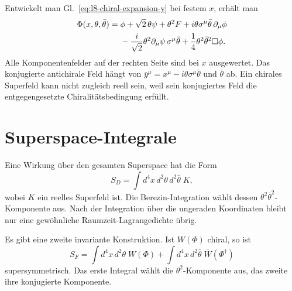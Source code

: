 Entwickelt man Gl.~\eqref{eq:l8-chiral-expansion-y} bei festem \(x\), erhält man
\begin{align}
\Phi(x,\theta,\bar\theta)
={}&\phi
+\sqrt2\,\theta\psi
+\theta^2F
+i\theta\sigma^\mu\bar\theta\,\partial_\mu\phi
\notag\\
&-\frac{i}{\sqrt2}\theta^2
\partial_\mu\psi\,\sigma^\mu\bar\theta
+\frac14\theta^2\bar\theta^2\Box\phi.
\label{eq:l8-chiral-expansion-x}
\end{align}
Alle Komponentenfelder auf der rechten Seite sind bei \(x\) ausgewertet. Das konjugierte antichirale Feld hängt von
\(\bar y^\mu=x^\mu-i\theta\sigma^\mu\bar\theta\) und \(\bar\theta\) ab. Ein chirales Superfeld kann nicht zugleich reell sein, weil sein konjugiertes Feld die entgegengesetzte Chiralitätsbedingung erfüllt.

\section{Superspace-Integrale}

Eine Wirkung über den gesamten Superspace hat die Form
\begin{equation}
S_D=\int d^4x\,d^2\theta\,d^2\bar\theta\;K,
\label{eq:l8-D-term-action}
\end{equation}
wobei \(K\) ein reelles Superfeld ist. Die Berezin-Integration wählt dessen
\(\theta^2\bar\theta^2\)-Komponente aus. Nach der Integration über die ungeraden Koordinaten bleibt nur eine gewöhnliche Raumzeit-Lagrangedichte übrig.

Es gibt eine zweite invariante Konstruktion. Ist \(W(\Phi)\) chiral, so ist
\begin{equation}
S_F=\int d^4x\,d^2\theta\;W(\Phi)
+\int d^4x\,d^2\bar\theta\;\overline{W}(\Phi^\dagger)
\label{eq:l8-F-term-action}
\end{equation}
supersymmetrisch. Das erste Integral wählt die \(\theta^2\)-Komponente aus, das zweite ihre konjugierte Komponente.

\begin{classroomqa}
\end{classroomqa}

